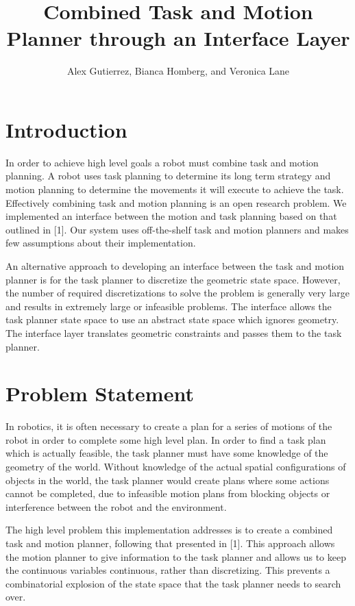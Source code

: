 \documentclass[12pt]{article}
\title{Combined Task and Motion Planner through an Interface Layer}
\author{Alex Gutierrez, Bianca Homberg, and Veronica Lane}
\begin{document}
\maketitle

\section{Introduction}

In order to achieve high level goals a robot must combine task and motion planning. 
A robot uses task planning to determine its long term strategy and motion planning to determine the movements it  will execute to achieve the task. 
Effectively combining task and motion planning is an open research problem. 
We implemented an interface between the motion and task planning based on that outlined in [1]. 
Our system uses off-the-shelf task and motion planners and makes few assumptions about their implementation.
 
An alternative approach to developing an interface between the task and motion planner is for the task planner to discretize the geometric state space. 
However, the number of required discretizations to solve the problem is generally very large and results in extremely large or infeasible problems. 
The interface allows the task planner state space to use an abstract state space which ignores geometry. 
The interface layer translates geometric constraints and passes them to the task planner.

\section{Problem Statement}

In robotics, it is often necessary to create a plan for a series of motions of the robot in order to complete some high level plan.
In order to find a task plan which is actually feasible, the task planner must have some knowledge of the geometry of the world.
Without knowledge of the actual spatial configurations of objects in the world, the task planner would create plans where some actions cannot be completed, due to infeasible motion plans from blocking objects or interference between the robot and the environment.

The high level problem this implementation addresses is to create a combined task and motion planner, following that presented in [1].  
This approach allows the motion planner to give information to the task planner and allows us to keep the continuous variables continuous, rather than discretizing.  
This prevents a combinatorial explosion of the state space that the task planner needs to search over.
\end{document}
